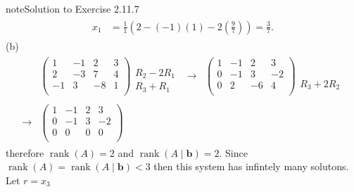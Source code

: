 \documentclass[letterpaper,10pt,english]{jupyterBook}
\begin{document}
\begin{sphinxadmonition}{note}{Solution to Exercise 2.11.7}
\begin{equation*}
\begin{split}
\begin{align*}
    x_{1} &= \frac{1}{1} \left( 2 - \left( -1 \right) \left( 1 \right) - 2 \left( \frac{9}{7} \right)\right) = \frac{3}{7}.
\end{align*} \end{split}
\end{equation*}
\sphinxAtStartPar
(b)
\begin{equation*}
\begin{split} \begin{align*}
&    \left( \begin{array}{ccc|c}
         1 & -1 & 2 & 3 \\
         2 & -3 & 7 & 4 \\
         -1 & 3 & -8 & 1 \\
    \end{array} \right)
    \begin{matrix} \phantom{x} \\ R_{2} - 2 R_{1} \\ R_{3} + R_{1} \end{matrix} &
    \longrightarrow &
    \left( \begin{array}{ccc|c}
         1 & -1 & 2 & 3 \\
         0 & -1 & 3 & -2 \\
         0 & 2 & -6 & 4 \\
    \end{array} \right)
    \begin{matrix} \phantom{x} \\ \phantom{x} \\ R_{3} + 2 R_{2} \end{matrix} \\ \\
    \longrightarrow &
    \left( \begin{array}{ccc|c}
         1 & -1 & 2 & 3 \\
         0 & -1 & 3 & -2 \\
         0 & 0 & 0 & 0 \\
    \end{array} \right)
\end{align*} \end{split}
\end{equation*}
\sphinxAtStartPar
therefore \(\operatorname{rank}(A) = 2\) and \(\operatorname{rank}(A \mid \mathbf{b}) = 2\). Since \(\operatorname{rank}(A) = \operatorname{rank}(A \mid \mathbf{b}) < 3\) then this system has infintely many solutons. Let \(r = x_3\)
\begin{equation*}
\begin{split} \begin{align*}

\end{align*}
\end{split}
\end{equation*}
\end{sphinxadmonition}
\end{document}
